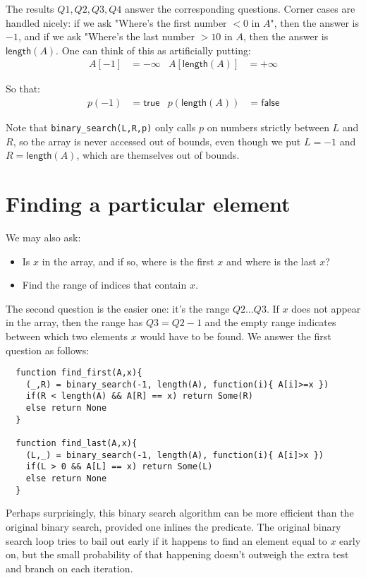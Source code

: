 \documentclass[a4paper, 11pt]{article}
\begin{document}
\noindent The results $Q1,Q2,Q3,Q4$ answer the corresponding questions. Corner cases are handled nicely: if we ask "Where's the first number $<0$ in $A$", then the answer is $-1$, and if we ask "Where's the last number $>10$ in $A$, then the answer is $\mathsf{length}(A)$. One can think of this as artificially putting:
\begin{align*}
  A[-1] &= -\infty & A[\mathsf{length}(A)] &= +\infty
\end{align*}

So that:
\begin{align*}
  p(-1) &= \mathsf{true} & p(\mathsf{length}(A)) &= \mathsf{false}
\end{align*}

Note that \lstinline|binary_search(L,R,p)| only calls $p$ on numbers strictly between $L$ and $R$, so the array is never accessed out of bounds, even though we put $L=-1$ and $R=\mathsf{length}(A)$, which are themselves out of bounds.

\section{Finding a particular element}

We may also ask:

\begin{itemize}
  \item Is $x$ in the array, and if so, where is the first $x$ and where is the last $x$?
  \item Find the range of indices that contain $x$.
\end{itemize}

\noindent The second question is the easier one: it's the range $Q2\dots Q3$. If $x$ does not appear in the array, then the range has $Q3 = Q2 - 1$ and the empty range indicates between which two elements $x$ would have to be found. We answer the first question as follows:

\begin{lstlisting}
  function find_first(A,x){
    (_,R) = binary_search(-1, length(A), function(i){ A[i]>=x })
    if(R < length(A) && A[R] == x) return Some(R)
    else return None
  }

  function find_last(A,x){
    (L,_) = binary_search(-1, length(A), function(i){ A[i]>x })
    if(L > 0 && A[L] == x) return Some(L)
    else return None
  }
\end{lstlisting}

Perhaps surprisingly, this binary search algorithm can be more efficient than the original binary search, provided one inlines the predicate. The original binary search loop tries to bail out early if it happens to find an element equal to $x$ early on, but the small probability of that happening doesn't outweigh the extra test and branch on each iteration.
\end{document}
